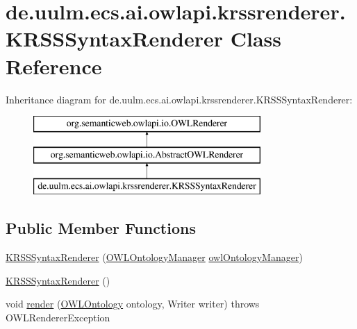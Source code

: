 \hypertarget{classde_1_1uulm_1_1ecs_1_1ai_1_1owlapi_1_1krssrenderer_1_1_k_r_s_s_syntax_renderer}{\section{de.\-uulm.\-ecs.\-ai.\-owlapi.\-krssrenderer.\-K\-R\-S\-S\-Syntax\-Renderer Class Reference}
\label{classde_1_1uulm_1_1ecs_1_1ai_1_1owlapi_1_1krssrenderer_1_1_k_r_s_s_syntax_renderer}
}
Inheritance diagram for de.\-uulm.\-ecs.\-ai.\-owlapi.\-krssrenderer.\-K\-R\-S\-S\-Syntax\-Renderer\-:\begin{figure}[H]
\begin{center}
\leavevmode
\includegraphics[height=3.000000cm]{classde_1_1uulm_1_1ecs_1_1ai_1_1owlapi_1_1krssrenderer_1_1_k_r_s_s_syntax_renderer}
\end{center}
\end{figure}
\subsection*{Public Member Functions}
\begin{DoxyCompactItemize}
\item 
\hyperlink{classde_1_1uulm_1_1ecs_1_1ai_1_1owlapi_1_1krssrenderer_1_1_k_r_s_s_syntax_renderer_a4be1a87927065856f77064a277255e67}{K\-R\-S\-S\-Syntax\-Renderer} (\hyperlink{interfaceorg_1_1semanticweb_1_1owlapi_1_1model_1_1_o_w_l_ontology_manager}{O\-W\-L\-Ontology\-Manager} \hyperlink{classorg_1_1semanticweb_1_1owlapi_1_1io_1_1_abstract_o_w_l_renderer_abb9888586f19a7a923cba542d99f1556}{owl\-Ontology\-Manager})
\item 
\hyperlink{classde_1_1uulm_1_1ecs_1_1ai_1_1owlapi_1_1krssrenderer_1_1_k_r_s_s_syntax_renderer_ac31939025355482082b28ea85b084615}{K\-R\-S\-S\-Syntax\-Renderer} ()
\item 
void \hyperlink{classde_1_1uulm_1_1ecs_1_1ai_1_1owlapi_1_1krssrenderer_1_1_k_r_s_s_syntax_renderer_a523387e9b3fff4ab6e1c78cbb03c48a6}{render} (\hyperlink{interfaceorg_1_1semanticweb_1_1owlapi_1_1model_1_1_o_w_l_ontology}{O\-W\-L\-Ontology} ontology, Writer writer)  throws O\-W\-L\-Renderer\-Exception 
\end{DoxyCompactItemize}
